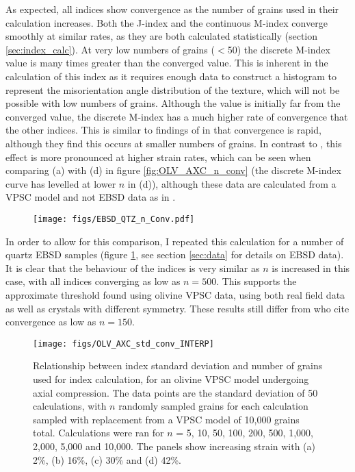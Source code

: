 \documentclass[a4paper,12pt]{report}
\numberwithin{equation}{chapter}
\begin{document}
As expected, all indices show convergence as the number of grains used in their calculation increases. Both the J-index and the continuous M-index converge smoothly at similar rates, as they are both calculated statistically (section \ref{sec:index_calc}). At very low numbers of grains ($<$50) the discrete M-index value is many times greater than the converged value. This is inherent in the calculation of this index as it requires enough data to construct a histogram to represent the misorientation angle distribution of the texture, which will not be possible with low numbers of grains. Although the value is initially far from the converged value, the discrete M-index has a much higher rate of convergence that the other indices. This is similar to findings of \cite{Skemer} in that convergence is rapid, although they find this occurs at smaller numbers of grains. In contrast to \cite{Skemer}, this effect is more pronounced at higher strain rates, which can be seen when comparing (a) with (d) in figure \ref{fig:OLV_AXC_n_conv} (the discrete M-index curve has levelled at lower $n$ in (d)), although these data are calculated from a VPSC model and not EBSD data as in \cite{Skemer}.

\begin{figure}[t!]
  \centering
    \texttt{[image: figs/EBSD\_QTZ\_n\_Conv.pdf]}
  \caption[Convergence with no. of grains (quartz EBSD)]{}
  \label{fig:EBSD_QTZ_n_conv}
\end{figure}

In order to allow for this comparison, I repeated this calculation for a number of quartz EBSD samples (figure \ref{fig:EBSD_QTZ_n_conv}, see section \ref{sec:data} for details on EBSD data). It is clear that the behaviour of the indices is very similar as $n$ is increased in this case, with all indices converging as low as $n = 500$. This supports the approximate threshold found using olivine VPSC data, using both real field data as well as crystals with  different symmetry. These results still differ from \cite{Skemer} who cite convergence as low as $n = 150$. 

      
\begin{figure}[h!]
  \centering
    \texttt{[image: figs/OLV\_AXC\_std\_conv\_INTERP]}
  \caption[Index error with no. grains (olivine)]{Relationship between index standard deviation and number of grains used for index calculation, for an olivine VPSC model undergoing axial compression. The data points are the standard deviation of 50 calculations, with $n$ randomly sampled grains for each calculation sampled with replacement from a VPSC model of 10,000 grains total. Calculations were ran for $n$ = 5, 10, 50, 100, 200, 500, 1,000, 2,000, 5,000 and 10,000. The panels show increasing strain with (a) 2\%, (b) 16\%, (c) 30\% and (d) 42\%. }
  \label{fig:OLV_AXC_n_conv_err}
\end{figure}
\end{document}
